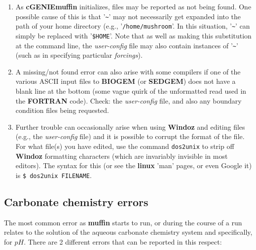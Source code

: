 \documentclass[11pt,fleqn]{book} %
\begin{document}
\vspace{1mm}
\begin{enumerate}

\vspace{1mm}
\item As \textbf{cGENIEmuffin} initializes, files may be reported as not being found. One possible cause of this is that '\texttt{\~{}}' may not necessarily get expanded into the path of your home directory (e.g., '\texttt{/home/mushroom}'. In this situation, '\texttt{\~{}}' can simply be replaced with '\texttt{\$HOME}'. Note that as well as making this substitution at the command line, the \textit{user-config} file may also contain instances of '\texttt{\~{}}' (such as in specifying particular \textit{forcings}).

\vspace{1mm}
\item A missing/not found error can also arise with some compilers if one of the various ASCII input files to \textbf{BIOGEM} (or \textbf{SEDGEM}) does not have a blank line at the bottom (some vague quirk of the unformatted read used in the \textbf{FORTRAN} code). Check: the \textit{user-config} file, and also any boundary condition files being requested.

\vspace{1mm}
\item Further trouble can occasionally arise when using \textbf{Windoz} and editing files (e.g., the \textit{user-config} file) and it is possible to corrupt the format of the file. For what file(s) you have edited, use the command \texttt{dos2unix} to strip off \textbf{Windoz} formatting characters (which are invariably invisible in most editors). The syntax for this (or see the \textbf{linux} 'man' pages, or even Google it) is \texttt{\$ dos2unix FILENAME}.

\end{enumerate}
\vspace{2mm}

%
\newpage
\subsection{Carbonate chemistry errors}

The most common error as \textbf{muffin} starts to run, or during the course of a run relates to the solution of the aqueous carbonate chemistry  system and specifically, for \(pH\). There are 2 different errors that can be reported in this respect:
\end{document}
